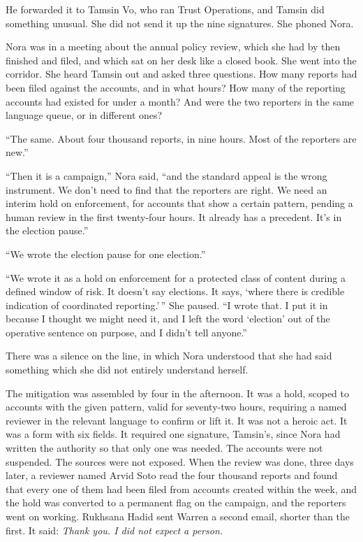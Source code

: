 He forwarded it to Tamsin Vo, who ran Trust Operations, and Tamsin did something unusual. She did not send it up the nine signatures. She phoned Nora.

Nora was in a meeting about the annual policy review, which she had by then finished and filed, and which sat on her desk like a closed book. She went into the corridor. She heard Tamsin out and asked three questions. How many reports had been filed against the accounts, and in what hours? How many of the reporting accounts had existed for under a month? And were the two reporters in the same language queue, or in different ones?

``The same. About four thousand reports, in nine hours. Most of the reporters are new.''

``Then it is a campaign,'' Nora said, ``and the standard appeal is the wrong instrument. We don't need to find that the reporters are right. We need an interim hold on enforcement, for accounts that show a certain pattern, pending a human review in the first twenty-four hours. It already has a precedent. It's in the election pause.''

``We wrote the election pause for one election.''

``We wrote it as a hold on enforcement for a protected class of content during a defined window of risk. It doesn't say elections. It says, `where there is credible indication of coordinated reporting.'\,'' She paused. ``I wrote that. I put it in because I thought we might need it, and I left the word `election' out of the operative sentence on purpose, and I didn't tell anyone.''

There was a silence on the line, in which Nora understood that she had said something which she did not entirely understand herself.

The mitigation was assembled by four in the afternoon. It was a hold, scoped to accounts with the given pattern, valid for seventy-two hours, requiring a named reviewer in the relevant language to confirm or lift it. It was not a heroic act. It was a form with six fields. It required one signature, Tamsin's, since Nora had written the authority so that only one was needed. The accounts were not suspended. The sources were not exposed. When the review was done, three days later, a reviewer named Arvid Soto read the four thousand reports and found that every one of them had been filed from accounts created within the week, and the hold was converted to a permanent flag on the campaign, and the reporters went on working. Rukhsana Hadid sent Warren a second email, shorter than the first. It said: \emph{Thank you. I did not expect a person.}

